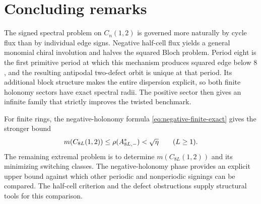\section{Concluding remarks}
\label{sec:conclusion}

The signed spectral problem on $C_n(1,2)$ is governed more naturally by cycle
flux than by individual edge signs.  Negative half-cell flux yields a general
monomial chiral involution and halves the squared Bloch problem.  Period eight
is the first primitive period at which this mechanism produces squared edge
below $8$, and the resulting antipodal two-defect orbit is unique at that
period.  Its additional block structure makes the entire dispersion explicit,
so both finite holonomy sectors have exact spectral radii.  The positive sector
then gives an infinite family that strictly improves the twisted benchmark.

For finite rings, the negative-holonomy formula
\eqref{eq:negative-finite-exact} gives the stronger bound
\[
 m(C_{8L}(1,2))\leq\rho(A_{8L,-}^{*})<\sqrt{\eta}
 \qquad(L\geq1).
\]
The remaining extremal problem is to determine $m(C_{8L}(1,2))$ and its
minimizing switching classes.  The negative-holonomy phase provides an explicit
upper bound against which other periodic and nonperiodic signings can be
compared.  The half-cell criterion and the defect obstructions supply
structural tools for this comparison.
